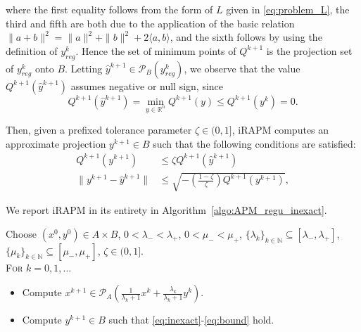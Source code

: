 \documentclass[pdflatex,sn-mathphys-num]{sn-jnl}
\numberwithin{equation}{section}%
\def\R{\mathbb{R}}
\newcommand{\yck}{{y_{reg}^k}}
\newcommand{\proj}{\mathcal{P}}
\theoremstyle{thmstyleone}%
\theoremstyle{thmstyletwo}%
\theoremstyle{thmstylethree}%
\begin{document}
{where the first equality follows from the form of $L$ given in \eqref{eq:problem_L}, the third and fifth are both due to the application of the basic relation $\|a+b\|^2=\|a\|^2+\|b\|^2+2\langle a,b\rangle$, and the sixth follows by using the definition of $y_{reg}^k$.}
Hence the set of minimum points of $Q^{k+1}$ is the projection set of $\yck$ onto $B$.
Letting $\hat{y}^{k+1}\in\mathcal{P}_B(\yck)$, we observe that the value $Q^{k+1}(\hat{y}^{k+1})$ assumes negative or null sign, since
\begin{equation}\label{eq:sign-Q}
    Q^{k+1}(\hat{y}^{k+1})=\min_{y\in\R^n}Q^{k+1}(y)\leq Q^{k+1}(y^k)=0.
\end{equation}

Then, given a prefixed tolerance parameter $\zeta\in(0,1]$, iRAPM computes an approximate projection $y^{k+1}\in B$ such that the following conditions are satisfied:
\begin{align}
    Q^{k+1}(y^{k+1})&\leq \zeta 
    Q^{k+1}(\hat{y}^{k+1})\label{eq:inexact}\\
    \|y^{k+1}-\hat{y}^{k+1}\|&\leq \sqrt{-\left(\frac{1-\zeta}{\zeta}\right)Q^{k+1}(y^{k+1})},\label{eq:bound}
\end{align}

We report iRAPM in its entirety in Algorithm~\ref{algo:APM_regu_inexact}. 
\begin{algorithm}[h!]\caption{inexact Regularized Alternating Projection Method (iRAPM)}\label{algo:APM_regu_inexact}
    Choose $(x^0,y^0) \in A\times B$, $0<\lambda_{-}<\lambda_+$, $0<\mu_{-}<\mu_+$, $\{\lambda_k\}_{k\in\mathbb{N}}\subseteq [\lambda_{-},\lambda_+]$, $\{\mu_k\}_{k\in\mathbb{N}}\subseteq [\mu_{-},\mu_{+}]$, $\zeta\in(0,1]$.\\
    
    {\textsc{For} $k=0,1,\ldots$}
    \begin{itemize}[leftmargin=2cm]
        \item[{\sc Step 1}] Compute $x^{k+1} \in \proj_A\left(\frac{1}{\lambda_k+1}x^k+\frac{\lambda_k}{\lambda_k+1}y^k\right)$.
        \item[{\sc Step 2}] Compute $y^{k+1}\in B$ such that \eqref{eq:inexact}-\eqref{eq:bound} hold.
    \end{itemize}
\end{algorithm}
\end{document}
